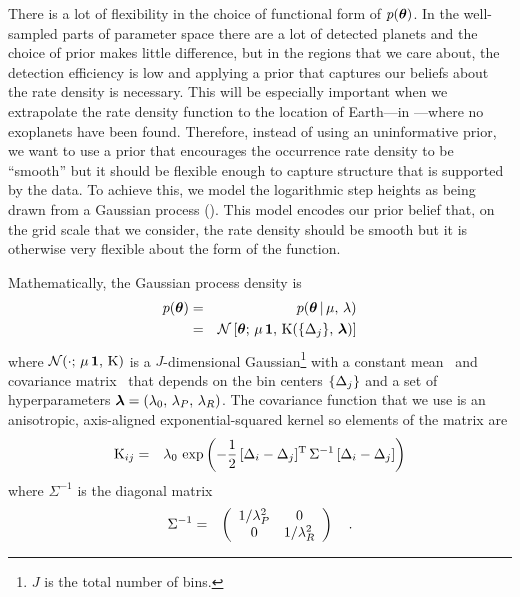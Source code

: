 There is a lot of flexibility in the choice of functional form of
$p({\boldsymbol{{\theta}}})$.
In the well-sampled parts of parameter space there are a lot of
detected planets and the choice of prior makes little difference, but in the
regions that we care about, the detection efficiency is low and applying a
prior that captures our beliefs about the rate density is necessary.
This will be especially important when we extrapolate the rate density
function to the location of Earth---in ---where no exoplanets
have been found.
Therefore, instead of using an uninformative prior, we want to use a prior
that encourages the occurrence rate density to be ``smooth'' but it should be
flexible enough to capture structure that is supported by the data.
To achieve this, we model the logarithmic step heights as being drawn from a
Gaussian process (\citealt{Rasmussen:2006, Gibson:2012, Ambikasaran:2014}).
This model encodes our prior belief that, on the grid scale that we consider,
the rate density should be smooth but it is otherwise very flexible about the
form of the function.

Mathematically, the Gaussian process density is
\begin{eqnarray}
p(\ratepars) &=& p(\ratepars\,|\,\mean,\,\smooth) \nonumber\\
&=& \mathcal{N} \left[\ratepars;\,\mean\,\bvec{1},\,
\cov(\{\binarea_j\},\,\smoothpars)\right]
\eqlabel{gp}
\end{eqnarray}
where $\mathcal{N}(\cdot;\,{\mu}\,\boldsymbol{1},\,{\mathrm{K}})$ is a $J$-dimensional
Gaussian\footnote{$J$ is the total number of bins.} with a constant mean
\mean\ and covariance matrix \cov\ that depends on the bin centers
$\{{\Delta}_j\}$ and a set of hyperparameters ${\boldsymbol{{\lambda}}} = ({\lambda}_0,\,
{\lambda}_{P},\,{\lambda}_{R})$.
The covariance function that we use is an anisotropic, axis-aligned
exponential-squared kernel so elements of the matrix are
\begin{eqnarray}
{\ensuremath{\mathrm{K}}}_{ij} &=& {\lambda}_0\,\exp\left(-\frac{1}{2}\,
    [{\Delta}_i-{\Delta}_j]^\mathrm{T}\,\Sigma^{-1}\,[{\Delta}_i-{\Delta}_j]
\right)
\end{eqnarray}
where $\Sigma^{-1}$ is the diagonal matrix
\begin{eqnarray}
\Sigma^{-1} &=& \left(\begin{array}{cc}
1/{\lambda}_{P}^2 & 0 \\
0 & 1/{\lambda}_{R}^2
\end{array}\right) \quad.
\end{eqnarray}

